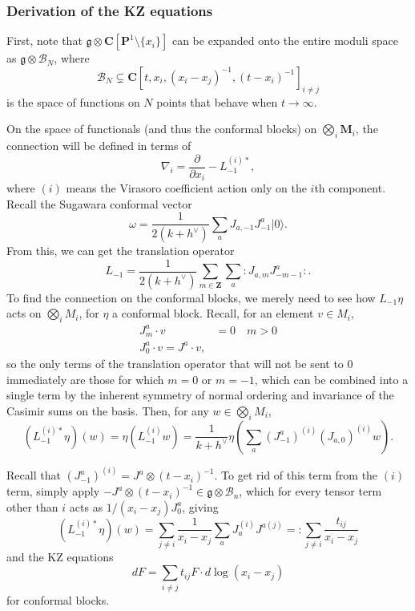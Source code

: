 \documentclass{article}
\newcommand{\CC}{\mathbold{C}}
\newcommand{\ZZ}{\mathbold{Z}}
\newcommand{\PP}{\mathbold{P}}
\newcommand{\MM}{\mathbold{M}}
\newcommand{\vac}{|0\rangle}
\newcommand{\Bb}{\mathcal{B}}
\newcommand{\gf}{\mathfrak{g}}
\newcommand{\normord}[1]{:\mathrel{#1}:}
\begin{document}
\subsubsection{Derivation of the KZ equations}
First, note that $\gf \otimes \CC[\PP^1 \setminus \{x_i\}]$ can be expanded onto the entire moduli space as $\gf \otimes \Bb_N$, where
\[\Bb_N \subsetneq \CC[t,x_i,(x_i-x_j)^{-1},(t-x_i)^{-1}]_{i \ne j} \]
is the space of functions on $N$ points that behave when $t \rightarrow \infty$.

On the space of functionals (and thus the conformal blocks) on $\bigotimes_i \MM_i$, the connection will be defined in terms of
\[\nabla_i = \frac{\partial}{\partial x_i} - L^{(i)*}_{-1}, \]
where $(i)$ means the Virasoro coefficient action only on the $i$th component.  Recall the Sugawara conformal vector
\[\omega = \frac{1}{2(k+h^\vee)} \sum_a J_{a,-1}J^a_{-1} \vac. \]
From this, we can get the translation operator
\[L_{-1} = \frac{1}{2(k+h^\vee)} \sum_{m \in \ZZ} \sum_a \normord{J_{a,m}J^a_{-m-1}}. \]
To find the connection on the conformal blocks, we merely need to see how $L_{-1}\eta$ acts on $\bigotimes_i M_i$, for $\eta$ a conformal block.  Recall, for an element $v \in M_i$,
\begin{align}
  J^a_m \cdot v&=0 \quad m>0\\
  J^a_0 \cdot v=J^a\cdot v,
\end{align}
so the only terms of the translation operator that will not be sent to $0$ immediately are those for which $m=0$ or $m=-1$, which can be combined into a single term by the inherent symmetry of normal ordering and invariance of the Casimir sums on the basis.
Then, for any $w \in \bigotimes_i M_i$,
\[(L^{(i)*}_{-1}\eta)(w)=\eta(L^{(i)}_{-1}w)=\frac{1}{k+h^\vee}\eta \left( \sum_a (J^a_{-1})^{(i)}(J_{a,0})^{(i)}w \right). \]

Recall that $(J^a_{-1})^{(i)}=J^a \otimes (t-x_i)^{-1}$.  To get rid of this term from the $(i)$ term, simply apply $-J^a \otimes (t-x_i)^{-1} \in \gf \otimes \Bb_n$, which for every tensor term other than $i$ acts as $1/(x_i-x_j)J^a_0$, giving
\[(L^{(i)*}_{-1}\eta)(w)=\sum_{j \ne i}\frac{1}{x_i-x_j} \sum_a J_a^{(i)}J^{a(j)} =: \sum_{j \ne i} \frac{t_{ij}}{x_i-x_j} \] 
and the KZ equations
\[dF = \sum_{i \ne j}t_{ij}F \cdot d\log(x_i-x_j) \]
for conformal blocks.  
\end{document}
